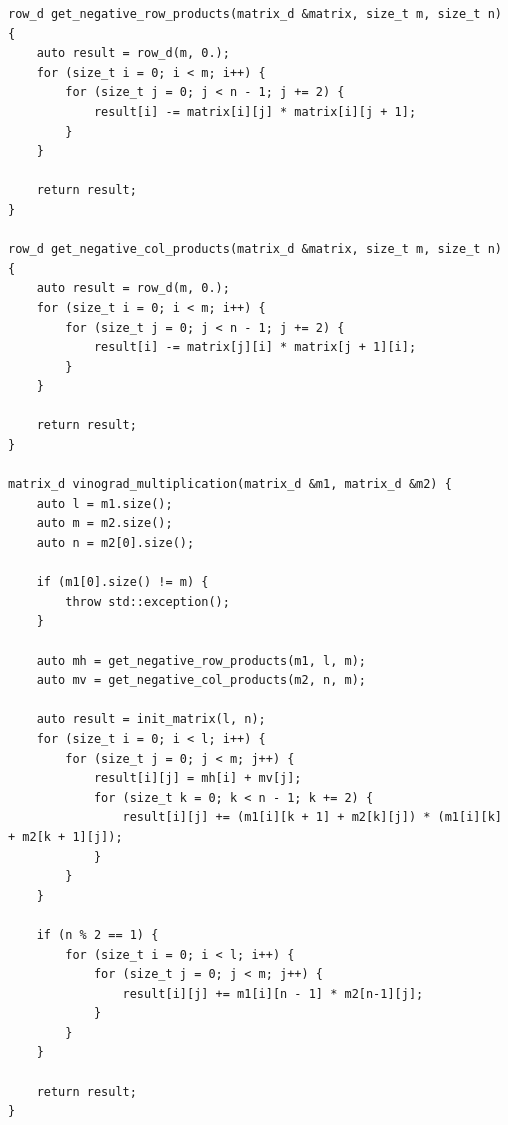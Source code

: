 \documentclass[a4paper,12pt]{article}
\begin{document}
\begin{lstlisting}[frame=single,caption=последовательный Алгоритм Винограда, breaklines]
row_d get_negative_row_products(matrix_d &matrix, size_t m, size_t n) {
    auto result = row_d(m, 0.);
    for (size_t i = 0; i < m; i++) {
        for (size_t j = 0; j < n - 1; j += 2) {
            result[i] -= matrix[i][j] * matrix[i][j + 1];
        }
    }

    return result;
}

row_d get_negative_col_products(matrix_d &matrix, size_t m, size_t n) {
    auto result = row_d(m, 0.);
    for (size_t i = 0; i < m; i++) {
        for (size_t j = 0; j < n - 1; j += 2) {
            result[i] -= matrix[j][i] * matrix[j + 1][i];
        }
    }

    return result;
}

matrix_d vinograd_multiplication(matrix_d &m1, matrix_d &m2) {
    auto l = m1.size();
    auto m = m2.size();
    auto n = m2[0].size();

    if (m1[0].size() != m) {
        throw std::exception();
    }

    auto mh = get_negative_row_products(m1, l, m);
    auto mv = get_negative_col_products(m2, n, m);

    auto result = init_matrix(l, n);
    for (size_t i = 0; i < l; i++) {
        for (size_t j = 0; j < m; j++) {
            result[i][j] = mh[i] + mv[j];
            for (size_t k = 0; k < n - 1; k += 2) {
                result[i][j] += (m1[i][k + 1] + m2[k][j]) * (m1[i][k] + m2[k + 1][j]);
            }
        }
    }

    if (n % 2 == 1) {
        for (size_t i = 0; i < l; i++) {
            for (size_t j = 0; j < m; j++) {
                result[i][j] += m1[i][n - 1] * m2[n-1][j];
            }
        }
    }

    return result;
}
\end{lstlisting}
\end{document}
